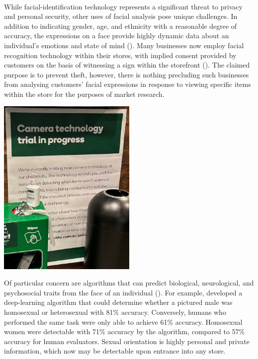 \documentclass{article}
\begin{document}
\vspace{0.3cm} \\
While facial-identification technology represents a significant threat to privacy and personal security, other uses of facial analysis pose unique challenges. In addition to indicating gender, age, and ethnicity with a reasonable degree of accuracy, the expressions on a face provide highly dynamic data about an individual's emotions and state of mind (\cite{conde2024five}). Many businesses now employ facial recognition technology within their stores, with implied consent provided by customers on the basis of witnessing a sign within the storefront (\cite{Vladimirova2024}). The claimed purpose is to prevent theft, however, there is nothing precluding such businesses from analysing customers' facial expressions in response to viewing specific items within the store for the purposes of market research.
\begin{center}
{\includegraphics[width=0.5\textwidth]{signcropped.png}}
\end{center}
Of particular concern are algorithms that can predict biological, neurological, and psychosocial traits from the face of an individual (\cite{conde2024five}). For example, \cite{Wang2018} developed a deep-learning algorithm that could determine whether a pictured male was homosexual or heterosexual with 81\% accuracy. Conversely, humans who performed the same task were only able to achieve 61\% accuracy. Homosexual women were detectable with 71\% accuracy by the algorithm, compared to 57\% accuracy for human evaluators. Sexual orientation is highly personal and private information, which now may be detectable upon entrance into any store.        
\vspace{0.3cm} \\
\end{document}
